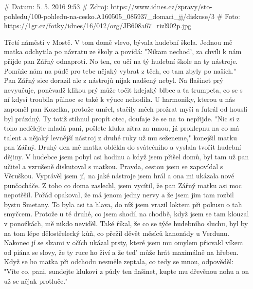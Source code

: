 # Datum: 5. 5. 2016 9:53
# Zdroj: https://www.idnes.cz/zpravy/sto-pohledu/100-pohledu-na-cesko.A160505_085937_domaci_jj/diskuse/3
# Foto: https://1gr.cz/fotky/idnes/16/012/org/JB608a67_rizl902p.jpg

Třetí náměstí v Mostě. V tom domě vlevo, bývala hudební škola. Jednou
mě matka odchytila po návratu ze školy a povídá: "Nikam nechod', za
chvíli k nám přijde pan Zářný odnaproti. No ten, co učí na tý hudební
škole na ty nástroje. Pomůže nám na půdě pro tebe nějaký vybrat z
těch, co tam zbyly po našich." Pan Zářný sice dorazil ale z nástrojů
nijak nadšený nebyl. Na flašinet prý nevyučuje, poněvadž klikou prý
může točit kdejaký blbec a ta trumpeta, co se s ní kdysi troubila
půlnoc se také k výuce nehodila. U harmoniky, kterou u nás zapoměl pan
Kozelka, protože umřel, stačily měch prožrat myši a futrál od houslí
byl prázdný. Ty totiž stihnul propít otec, doufaje že se na to
nepřijde. "Nic si z toho nedělejte mladá paní, pošlete kluka zítra za
mnou, já proklepnu na co má talent a nějaký levnější nástroj z druhé
ruky už mu seženeme," konejšil matku pan Zářný. Druhý den mě matka
oblékla do svátečního a vyslala tvořit hudební dějiny. V hudebce jsem
pobyl asi hodinu a když jsem přišel domů, byl tam už pan učitel a
vzrušeně diskutoval s matkou. Pravda, cestou jsem se zapovídal s
Věruškou. Vyprávěl jsem jí, na jaké nástroje jsem hrál a ona mi
ukázala nové punčocháče. Z toho co doma zaslechl, jsem vycítil, že pan
Zářný matku asi moc nepotěšil. Pořád opakoval, že má jenom jedny nervy
a že jsem jim tam rozbil bystu Smetany. To byla asi ta hlava, do níž
jsem vrazil loktem při pokusu o tah smyčcem. Protože u té druhé, co
jsem shodil na chodbě, když jsem se tam klouzal v ponožkách, mě nikdo
neviděl. Také říkal, že co se týče hudebního sluchu, byl by na tom
lépe dělostřelecký kůň, co přežil děvět měsíců kanonády u Verdunu.
Nakonec jí se slzami v očích ukázal prsty, které jsem mu omylem
přicvakl víkem od piána se slovy, že ty ruce ho živí a že ted' může
hrát maximálně na hřeben. Když se ho matka při odchodu nesměle
zeptala, co tedy se mnou, odpověděl: "Víte co, pani, sundejte klukovi
z půdy ten flašinet, kupte mu dřevěnou nohu a on už se nějak
protluče."
